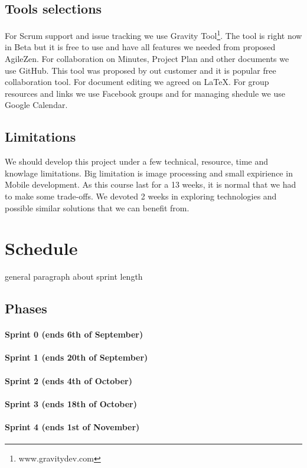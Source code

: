 \documentclass{article}
\begin{document}
\subsection{Tools selections}
For Scrum support and issue tracking we use Gravity Tool\footnote{www.gravitydev.com}. 
The tool is right now in Beta but it is free to use and have all features we needed from proposed AgileZen.
For collaboration on Minutes, Project Plan and other documents we use GitHub. This tool was proposed by out customer and it is popular free collaboration tool.
For document editing we agreed on LaTeX.
For group resources and links we use Facebook groups and for managing shedule we use Google Calendar.
 
\subsection{Limitations}
We should develop this project under a few technical, resource, time and knowlage limitations. 
Big limitation is image processing and small expirience in Mobile development.
As this course last for a 13 weeks, it is normal that we had to make some trade-offs. We devoted 2 weeks in exploring technologies and possible similar solutions that we can benefit from.
  
  
\section{Schedule}
general paragraph about sprint length
\subsection{Phases}
\paragraph{Sprint 0 (ends 6th of September)}
\paragraph{Sprint 1 (ends 20th of September)}
\paragraph{Sprint 2 (ends 4th of October)}
\paragraph{Sprint 3 (ends 18th of October)}
\paragraph{Sprint 4 (ends 1st of November)}
\end{document}
